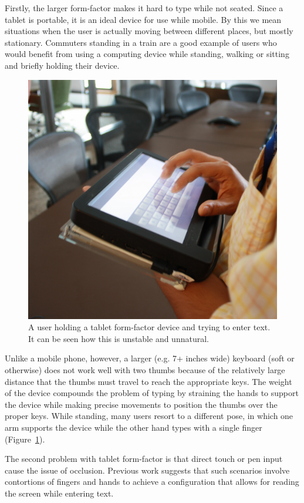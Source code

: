 Firstly, the larger form-factor makes it hard to type while not seated. Since a tablet is portable, it is an ideal device for use while mobile. By this we mean situations when the user is actually moving between different places, but mostly stationary. Commuters standing in a train are a good example of users who would benefit from using a computing device while standing, walking or sitting and briefly holding their device.
\begin{figure}
    \includegraphics[scale=0.35]{Figures/device_hold.pdf} 
  	\caption{A user holding a tablet form-factor device and trying to enter text. It can be seen how this is unstable and unnatural.}
    \label{fig:device_hold}
\end{figure}
Unlike a mobile phone, however, a larger (e.g. 7+ inches wide)  keyboard (soft or otherwise) does not work well with two thumbs because of the relatively large distance that the thumbs must travel to reach the appropriate keys. The weight of the device compounds the problem of typing by straining the hands to support the device while making precise movements to position the thumbs over the proper keys. While standing, many users resort to a different pose, in which one arm supports the device while the other hand types with a single finger (Figure~\ref{fig:device_hold}). 

The second problem with tablet form-factor is that direct touch or pen input cause the issue of occlusion. Previous work suggests that such scenarios involve contortions of fingers and hands to achieve a configuration that allows for reading the screen while entering text. \cite{Vogel}

